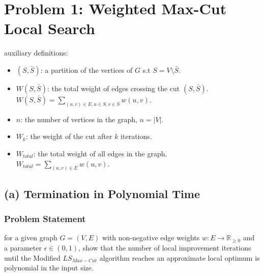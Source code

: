 \section*{Problem 1: Weighted Max-Cut Local Search}
auxiliary definitions:
\begin{itemize}
    \item $(S, \bar{S})$: a partition of the vertices of $G$ s.t $S = V \setminus \bar{S}$.
    
    \item $W(S, \bar{S})$: the total weight of edges crossing the cut $(S, \bar{S})$. $W(S, \bar{S}) = \sum_{(u,v) \in E, u \in S, v \in \bar{S}} w(u,v)$.
    
    \item $n$: the number of vertices in the graph, $n = |V|$.
    
    \item $W_k$: the weight of the cut after $k$ iterations.
    
    \item $W_{total}$: the total weight of all edges in the graph. $W_{total} = \sum_{(u,v) \in E} w(u,v)$.
\end{itemize}

\subsection*{(a) Termination in Polynomial Time}
\subsubsection*{Problem Statement}
for a given graph $G = (V, E)$ with non-negative edge weights $w: E \to \mathbb{R}_{\ge 0}$ and a parameter $\epsilon \in (0, 1)$, show that the number of local improvement iterations until the Modified $LS_{Max-Cut}$ algorithm reaches an approximate local optimum is polynomial in the input size.

